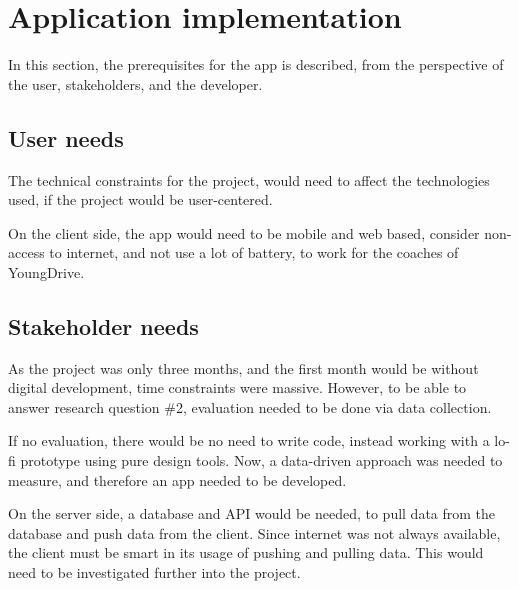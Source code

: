 \section{Application implementation}

In this section, the prerequisites for the app is described, from the perspective of the user, stakeholders, and the developer.

\subsection{User needs}

The technical constraints for the project, would need to affect the technologies used, if the project would be user-centered.

On the client side, the app would need to be mobile and web based, consider non-access to internet, and not use a lot of battery, to work for the coaches of YoungDrive.

\subsection{Stakeholder needs}

As the project was only three months, and the first month would be without digital development, time constraints were massive. However, to be able to answer research question \#2, evaluation needed to be done via data collection.

If no evaluation, there would be no need to write code, instead working with a lo-fi prototype using pure design tools. Now, a data-driven approach was needed to measure, and therefore an app needed to be developed.

On the server side, a database and API would be needed, to pull data from the database and push data from the client. Since internet was not always available, the client must be smart in its usage of pushing and pulling data. This would need to be investigated further into the project.













